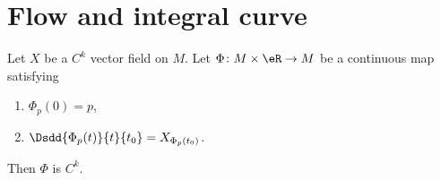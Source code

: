 

\section{Flow and integral curve}


\begin{proposition}      \label{PROPooQVQAooJVdwOa}
	Let \( X\) be a \( C^k\) vector field on \( M\). Let \( \Phi\colon M\times \eR\to M\) be a continuous map satisfying
	\begin{enumerate}
		\item
		      \( \Phi_p(0)=p\),
		\item
		      \( \Dsdd{ \Phi_p(t) }{t}{t_0}=X_{\Phi_p(t_0)}\).
	\end{enumerate}
	Then \( \Phi\) is \( C^k\).
\end{proposition}

